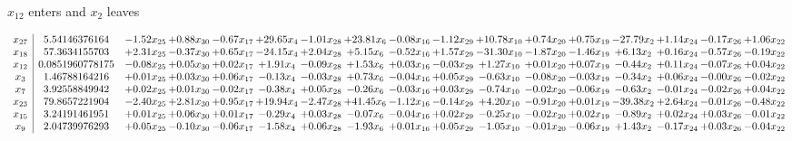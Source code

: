 \documentclass[9pt]{article}
\begin{document}
 $ x_{12} $ enters and $ x_{2} $ leaves 

 \[\begin{array}{c| c c@{\hskip 2pt} c@{\hskip 2pt} c@{\hskip 2pt} c@{\hskip 2pt} c@{\hskip 2pt} c@{\hskip 2pt} c@{\hskip 2pt} c@{\hskip 2pt} c@{\hskip 2pt} c@{\hskip 2pt} c@{\hskip 2pt} c@{\hskip 2pt} c@{\hskip 2pt} c@{\hskip 2pt} c@{\hskip 2pt} }
 x_{27}   &  5.54146376164 & -1.52 x_{25} & +  0.88 x_{30} & -0.67 x_{17} & + 29.65 x_{4} & -1.01 x_{28} & + 23.81 x_{6} & -0.08 x_{16} & -1.12 x_{29} & + 10.78 x_{10} & +  0.74 x_{20} & +  0.75 x_{19} & -27.79 x_{2} & +  1.14 x_{24} & -0.17 x_{26} & +  1.06 x_{22}\\
 x_{18}   &  57.3634155703 & +  2.31 x_{25} & -0.37 x_{30} & +  0.65 x_{17} & -24.15 x_{4} & +  2.04 x_{28} & +  5.15 x_{6} & -0.52 x_{16} & +  1.57 x_{29} & -31.30 x_{10} & -1.87 x_{20} & -1.46 x_{19} & +  6.13 x_{2} & +  0.16 x_{24} & -0.57 x_{26} & -0.19 x_{22}\\
 x_{12}   &  0.0851960778175 & -0.08 x_{25} & +  0.05 x_{30} & +  0.02 x_{17} & +  1.91 x_{4} & -0.09 x_{28} & +  1.53 x_{6} & +  0.03 x_{16} & -0.03 x_{29} & +  1.27 x_{10} & +  0.01 x_{20} & +  0.07 x_{19} & -0.44 x_{2} & +  0.11 x_{24} & -0.07 x_{26} & +  0.04 x_{22}\\
 x_{3}   &  1.46788164216 & +  0.01 x_{25} & +  0.03 x_{30} & +  0.06 x_{17} & -0.13 x_{4} & -0.03 x_{28} & +  0.73 x_{6} & -0.04 x_{16} & +  0.05 x_{29} & -0.63 x_{10} & -0.08 x_{20} & -0.03 x_{19} & -0.34 x_{2} & +  0.06 x_{24} & -0.00 x_{26} & -0.02 x_{22}\\
 x_{7}   &  3.92558849942 & +  0.02 x_{25} & +  0.01 x_{30} & -0.02 x_{17} & -0.38 x_{4} & +  0.05 x_{28} & -0.26 x_{6} & -0.03 x_{16} & +  0.03 x_{29} & -0.74 x_{10} & -0.02 x_{20} & -0.06 x_{19} & -0.63 x_{2} & -0.01 x_{24} & -0.02 x_{26} & +  0.04 x_{22}\\
 x_{23}   &  79.8657221904 & -2.40 x_{25} & +  2.81 x_{30} & +  0.95 x_{17} & + 19.94 x_{4} & -2.47 x_{28} & + 41.45 x_{6} & -1.12 x_{16} & -0.14 x_{29} & +  4.20 x_{10} & -0.91 x_{20} & +  0.01 x_{19} & -39.38 x_{2} & +  2.64 x_{24} & -0.01 x_{26} & -0.48 x_{22}\\
 x_{15}   &  3.24191461951 & +  0.01 x_{25} & +  0.06 x_{30} & +  0.01 x_{17} & -0.29 x_{4} & +  0.03 x_{28} & -0.07 x_{6} & -0.04 x_{16} & +  0.02 x_{29} & -0.25 x_{10} & -0.02 x_{20} & +  0.02 x_{19} & -0.89 x_{2} & +  0.02 x_{24} & +  0.03 x_{26} & -0.01 x_{22}\\
 x_{9}   &  2.04739976293 & +  0.05 x_{25} & -0.10 x_{30} & -0.06 x_{17} & -1.58 x_{4} & +  0.06 x_{28} & -1.93 x_{6} & +  0.01 x_{16} & +  0.05 x_{29} & -1.05 x_{10} & -0.01 x_{20} & -0.06 x_{19} & +  1.43 x_{2} & -0.17 x_{24} & +  0.03 x_{26} & -0.04 x_{22}\\

\end{array}\]
\end{document}
